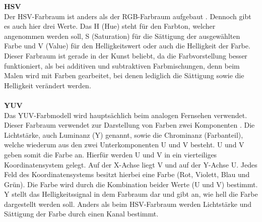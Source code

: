 \textbf{HSV}\label{s.hsv}\\
Der HSV-Farbraum ist anders als der RGB-Farbraum aufgebaut \cite[325f.]{jahne2013digitale}. Dennoch gibt es auch hier drei Werte. Das H (Hue) steht für den Farbton, welcher angenommen werden soll, S (Saturation) für die Sättigung der ausgewählten Farbe und V (Value) für den Helligkeitswert oder auch die Helligkeit der Farbe. Dieser Farbraum ist gerade in der Kunst beliebt, da die Farbvorstellung besser funktioniert, als bei additiven und subtraktiven Farbmischungen, denn beim Malen wird mit Farben gearbeitet, bei denen lediglich die Sättigung sowie die Helligkeit verändert werden.\\\\
\textbf{YUV}\label{s.lab}\\
Das YUV-Farbmodell wird hauptsächlich beim analogen Fernsehen verwendet. Dieser Farbraum verwendet zur Darstellung von Farben zwei Komponenten \cite[337f.]{jahne2013digitale}. Die Lichtstärke, auch Luminanz (Y) genannt, sowie die Chrominanz (Farbanteil), welche wiederum aus den zwei Unterkomponenten U und V besteht. U und V geben somit die Farbe an. Hierfür werden U und V in ein vierteiliges Koordinatensystem gelegt. Auf der X-Achse liegt V und auf der Y-Achse U. Jedes Feld des Koordinatensystems besitzt hierbei eine Farbe (Rot, Violett, Blau und Grün). Die Farbe wird durch die Kombination beider Werte (U und V) bestimmt. Y stellt das Helligkeitssignal in dem Farbraum dar und gibt an, wie hell die Farbe dargestellt werden soll. Anders als beim HSV-Farbraum werden Lichtstärke und Sättigung der Farbe durch einen Kanal bestimmt. 
